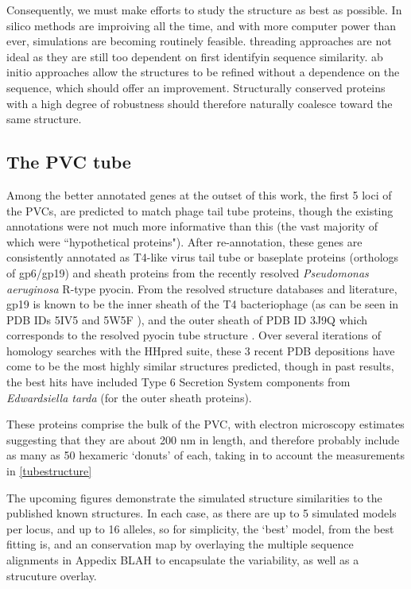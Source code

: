 Consequently, we must make efforts to study the structure as best as possible. In silico methods are improiving all the time, and with more computer power than ever, simulations are becoming routinely feasible. threading approaches are not ideal as they are still too dependent on first identifyin sequence similarity. ab initio approaches allow the structures to be refined without a dependence on the sequence, which should offer an improvement. Structurally conserved proteins with a high degree of robustness should therefore naturally coalesce toward the same structure.

\subsection{The PVC tube}
Among the better annotated genes at the outset of this work, the first 5 loci of the PVCs, are predicted to match phage tail tube proteins, though the existing annotations were not much more informative than this (the vast majority of which were ``hypothetical proteins"). After re-annotation, these genes are consistently annotated as T4-like virus tail tube or baseplate proteins (orthologs of gp6/gp19) and sheath proteins from the recently resolved \emph{Pseudomonas aeruginosa} R-type pyocin. From the resolved structure databases and literature, gp19 is known to be the inner sheath of the T4 bacteriophage (as can be seen in PDB IDs 5IV5 and 5W5F \citep{Taylor2016, Zheng2017}), and the outer sheath of PDB ID 3J9Q which corresponds to the resolved pyocin tube structure \citep{Ge2015a}. Over several iterations of homology searches with the HHpred suite, these 3 recent PDB depositions have come to be the most highly similar structures predicted, though in past results, the best hits have included Type 6 Secretion System components from \emph{Edwardsiella tarda} (for the outer sheath proteins).

These proteins comprise the bulk of the PVC, with electron microscopy estimates suggesting that they are about 200 nm in length, and therefore probably include as many as 50 hexameric `donuts' of each, taking in to account the measurements in \vref{tubestructure}


The upcoming figures demonstrate the simulated structure similarities to the published known structures. In each case, as there are up to 5 simulated models per locus, and up to 16 alleles, so for simplicity, the `best' model, from the best fitting is, and an conservation map by overlaying the multiple sequence alignments in Appedix BLAH  to encapsulate the variability, as well as a strucuture overlay.

